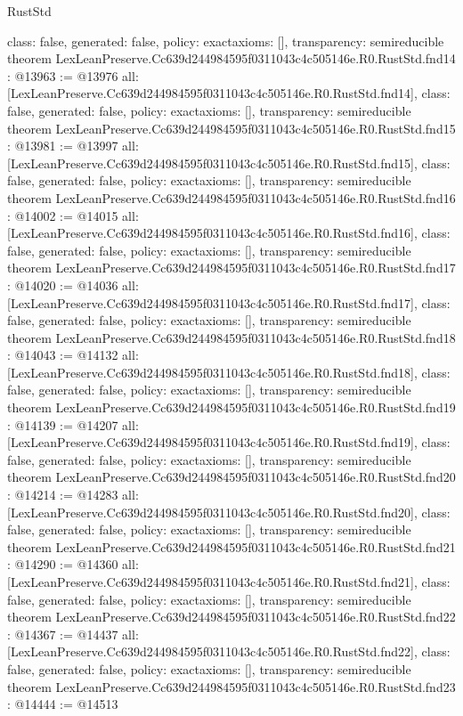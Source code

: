 \begin{lexlean}{RustStd}
\begin{coremodule}
{  class: false,
  generated: false,
  policy: exact{axioms: []},
  transparency: semireducible
}
theorem LexLeanPreserve.Cc639d244984595f0311043c4c505146e.R0.RustStd.fnd14 : @13963 := @13976 {
  all: [LexLeanPreserve.Cc639d244984595f0311043c4c505146e.R0.RustStd.fnd14],
  class: false,
  generated: false,
  policy: exact{axioms: []},
  transparency: semireducible
}
theorem LexLeanPreserve.Cc639d244984595f0311043c4c505146e.R0.RustStd.fnd15 : @13981 := @13997 {
  all: [LexLeanPreserve.Cc639d244984595f0311043c4c505146e.R0.RustStd.fnd15],
  class: false,
  generated: false,
  policy: exact{axioms: []},
  transparency: semireducible
}
theorem LexLeanPreserve.Cc639d244984595f0311043c4c505146e.R0.RustStd.fnd16 : @14002 := @14015 {
  all: [LexLeanPreserve.Cc639d244984595f0311043c4c505146e.R0.RustStd.fnd16],
  class: false,
  generated: false,
  policy: exact{axioms: []},
  transparency: semireducible
}
theorem LexLeanPreserve.Cc639d244984595f0311043c4c505146e.R0.RustStd.fnd17 : @14020 := @14036 {
  all: [LexLeanPreserve.Cc639d244984595f0311043c4c505146e.R0.RustStd.fnd17],
  class: false,
  generated: false,
  policy: exact{axioms: []},
  transparency: semireducible
}
theorem LexLeanPreserve.Cc639d244984595f0311043c4c505146e.R0.RustStd.fnd18 : @14043 := @14132 {
  all: [LexLeanPreserve.Cc639d244984595f0311043c4c505146e.R0.RustStd.fnd18],
  class: false,
  generated: false,
  policy: exact{axioms: []},
  transparency: semireducible
}
theorem LexLeanPreserve.Cc639d244984595f0311043c4c505146e.R0.RustStd.fnd19 : @14139 := @14207 {
  all: [LexLeanPreserve.Cc639d244984595f0311043c4c505146e.R0.RustStd.fnd19],
  class: false,
  generated: false,
  policy: exact{axioms: []},
  transparency: semireducible
}
theorem LexLeanPreserve.Cc639d244984595f0311043c4c505146e.R0.RustStd.fnd20 : @14214 := @14283 {
  all: [LexLeanPreserve.Cc639d244984595f0311043c4c505146e.R0.RustStd.fnd20],
  class: false,
  generated: false,
  policy: exact{axioms: []},
  transparency: semireducible
}
theorem LexLeanPreserve.Cc639d244984595f0311043c4c505146e.R0.RustStd.fnd21 : @14290 := @14360 {
  all: [LexLeanPreserve.Cc639d244984595f0311043c4c505146e.R0.RustStd.fnd21],
  class: false,
  generated: false,
  policy: exact{axioms: []},
  transparency: semireducible
}
theorem LexLeanPreserve.Cc639d244984595f0311043c4c505146e.R0.RustStd.fnd22 : @14367 := @14437 {
  all: [LexLeanPreserve.Cc639d244984595f0311043c4c505146e.R0.RustStd.fnd22],
  class: false,
  generated: false,
  policy: exact{axioms: []},
  transparency: semireducible
}
theorem LexLeanPreserve.Cc639d244984595f0311043c4c505146e.R0.RustStd.fnd23 : @14444 := @14513 {
}
\end{coremodule}
\end{lexlean}

